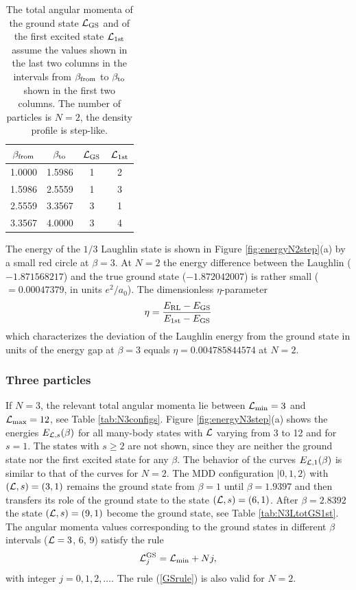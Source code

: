 \documentclass[aps,prb,10pt%
]{revtex4-2}
\def\be{\begin{equation}}
\def\ee{\end{equation}}
\begin{document}
\begin{table}[!ht]
\caption{The total angular momenta of the ground state ${\cal L}_{\rm GS}$ and of the first excited state ${\cal L}_{\rm 1st}$ assume the values shown in the last two columns in the intervals from $\beta_{\rm from}$ to $\beta_{\rm to}$ shown in the first two columns. The number of particles is  $N=2$, the density profile is step-like. \label{tab:N2LtotGS1st}}
\begin{tabular}{cccc}
$\beta_{\rm from}$ & $\beta_{\rm to}$   & ${\cal L}_{\rm GS}$   & ${\cal L}_{\rm 1st}$\\
\hline
1.0000	& 1.5986	& 1	& 2 \\
1.5986	& 2.5559	& 1	& 3 \\
2.5559	& 3.3567	& 3	& 1 \\
3.3567	& 4.0000	& 3	& 4 \\
\end{tabular}
\end{table}

The energy of the $1/3$ Laughlin state is shown in Figure \ref{fig:energyN2step}(a) by a small red circle at $\beta=3$. At $N=2$ the energy difference between the Laughlin ($-1.871568217$) and the true ground state ($-1.872042007$) is rather small ($=0.00047379$, in units $e^2/a_0$). The dimensionless $\eta$-parameter
\be 
\eta=\frac{E_{\rm RL}-E_{\rm GS}}{E_{\rm 1st}-E_{\rm GS}}\label{eta}
\ee
which characterizes the deviation of the Laughlin energy from the ground state in units of the energy gap at $\beta=3$ equals $\eta=0.004785844574$ at $N=2$.

\subsubsection{Three particles}

If $N=3$, the relevant total angular momenta lie between ${\cal L}_{\min}=3$ and ${\cal L}_{\max}=12$, see Table \ref{tab:N3configs}. Figure \ref{fig:energyN3step}(a) shows the energies $E_{{\cal L},s}(\beta)$ for all many-body states with ${\cal L}$ varying from 3 to 12 and for $s=1$. The states with $s\ge 2$ are not shown, since they are neither the ground state nor the first excited state for any $\beta$. The behavior of the curves $E_{{\cal L},1}(\beta)$ is similar to that of the curves for $N=2$. The MDD configuration $|0,1,2\rangle $ with $({\cal L},s)=(3,1)$ remains the ground state from $\beta=1$ until $\beta=1.9397$ and then transfers its role of the ground state to the state $({\cal L},s)=(6,1)$. After $\beta=2.8392$ the state $({\cal L},s)=(9,1)$ become the ground state, see Table \ref{tab:N3LtotGS1st}. The angular momenta values corresponding to the ground states in different $\beta$ intervals (${\cal L}=3$, 6, 9) satisfy the rule
\be 
{\cal L}_j^{\rm GS}={\cal L}_{\min}+Nj, \label{GSrule}
\ee
with integer $j=0,1,2,\dots$. The rule (\ref{GSrule}) is also valid for $N=2$. 
\end{document}
